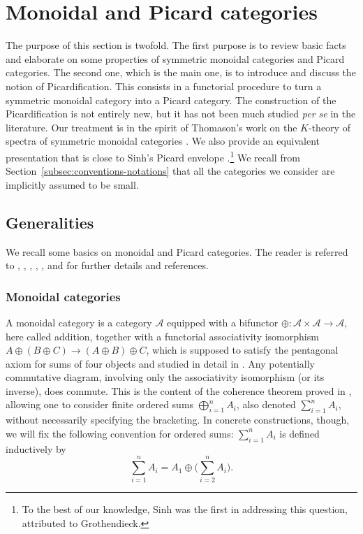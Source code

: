 \documentclass[JEP,XML,SOM,Unicode,published]{cedram}
\theoremstyle{plain}
\theoremstyle{definition}
\newcommand{\Acal}{\mathcal A}
\begin{document}
\section{Monoidal and Picard categories}\label{sec:monoidal-picard}
The purpose of this section is twofold. The first purpose is to review basic facts and elaborate on some properties of symmetric monoidal categories and Picard categories. The second one, which is the main one, is to introduce and discuss the notion of Picardification. This consists in a functorial procedure to turn a symmetric monoidal category into a Picard category. The construction of the Picardification is not entirely new, but it has not been much studied \emph{per se} in the literature. Our treatment is in the spirit of Thomason's work on the $K$-theory of spectra of symmetric monoidal categories \cite{ThomasonSpectral}. We also provide an equivalent presentation that is close to Sinh's Picard envelope \cite{Sinh-these}.\footnote{To the best of our knowledge, Sinh was the first in addressing this question, attributed to Grothendieck.} We recall from Section~\ref{subsec:conventions-notations} that all the categories we consider are implicitly assumed to be small.

\subsection{Generalities}
We recall some basics on monoidal and Picard categories. The reader is referred to \cite[\S 4]{Deligne-determinant}, \cite[App.\,A]{KnudsenMumford}, \cite{MacLane}, \cite{Richter}, \cite{Saavedra}, and \cite{Sinh-these} for further details and references.

\subsubsection{Monoidal categories}\label{subsub:monoidalcategories}
A monoidal category is a category $\Acal$ equipped with a bifunctor $\oplus: \Acal \times \Acal \to \Acal$, here called addition, together with a functorial associativity isomorphism $A\oplus (B \oplus C) \to (A \oplus B) \oplus C$, which is supposed to satisfy the pentagonal axiom for sums of four objects and studied in detail in \cite[p.\,33]{MacLane}. Any potentially commutative diagram, involving only the associativity isomorphism (or its inverse), does commute. This is the content of the coherence theorem proved in \cite[Th.\,3.1]{MacLane}, allowing one to consider finite ordered sums $\bigoplus_{i=1}^{n} A_i$, also denoted $\sum_{i=1}^{n} A_{i}$, without necessarily specifying the bracketing. In concrete constructions, though, we will fix the following convention for ordered sums: $\sum_{i=1}^{n}A_{i}$ is defined inductively by
\begin{equation}\label{eq:convention-sum}
\sum_{i=1}^{n}A_{i}=A_{1}\oplus \biggl(\sum_{i=2}^{n}A_{i}\biggr).
\end{equation}
\end{document}
